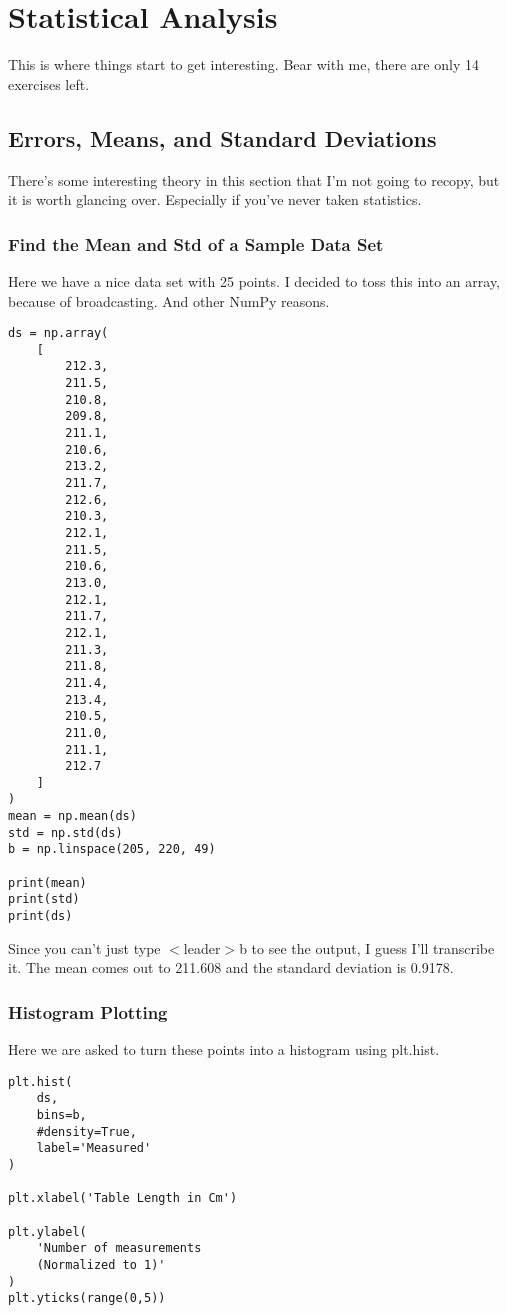 \documentclass{article}
\begin{document}
\section{Statistical Analysis}
This is where things start to get interesting. Bear with me, there are only 14
exercises left.

\subsection{Errors, Means, and Standard Deviations}
There's some interesting theory in this section that I'm not going to recopy,
but it is worth glancing over. Especially if you've never taken statistics. 

\subsubsection{Find the Mean and Std of a Sample Data Set}
Here we have a nice data set with 25 points. I decided to toss this into an
array, because of broadcasting. And other NumPy reasons.
\begin{center}
\begin{minipage}[t]{.75\textwidth}
\begin{lstlisting}[frame=tlrb]
ds = np.array(
    [
        212.3,
        211.5,
        210.8,
        209.8,
        211.1,
        210.6,
        213.2,
        211.7,
        212.6,
        210.3,
        212.1,
        211.5,
        210.6,
        213.0,
        212.1,
        211.7,
        212.1,
        211.3,
        211.8,
        211.4,
        213.4,
        210.5,
        211.0,
        211.1,
        212.7
    ]
)
mean = np.mean(ds)
std = np.std(ds)
b = np.linspace(205, 220, 49)

print(mean)
print(std)
print(ds)

\end{lstlisting}
\end{minipage}
\end{center}

Since you can't just type $<$leader$>$b to see the output, I guess I'll transcribe
it. The mean comes out to 211.608 and the standard deviation is 0.9178.

\subsubsection{Histogram Plotting}

Here we are asked to turn these points into a histogram using plt.hist.
\begin{center}
\begin{minipage}[t]{.75\textwidth}
\begin{lstlisting}[frame=tlrb]
plt.hist(
    ds,
    bins=b,
    #density=True,
    label='Measured'
)

plt.xlabel('Table Length in Cm')

plt.ylabel(
    'Number of measurements
    (Normalized to 1)'
)
plt.yticks(range(0,5))

\end{lstlisting}
\end{minipage}
\end{center}
\end{document}

